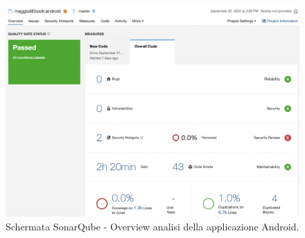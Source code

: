 \begin{figure}[H]
\centering
    \includegraphics[width=1\textwidth]{img/Screenshot 2022-09-28 at 16.22.16.png}
    \caption{Schermata SonarQube - Overview analisi della applicazione Android.}
    \label{analisipipeline}
\end{figure}